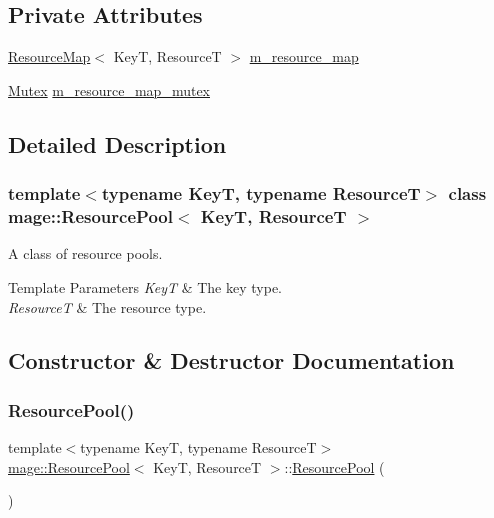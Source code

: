 \subsection*{Private Attributes}
\begin{DoxyCompactItemize}
\item 
\hyperlink{namespacemage_a3aaea9153b9e896914d7a1155d8c7bbe}{Resource\+Map}$<$ KeyT, ResourceT $>$ \hyperlink{classmage_1_1_resource_pool_aecc46ecca2a54ef2816137276b1d73cd}{m\+\_\+resource\+\_\+map}
\item 
\hyperlink{structmage_1_1_mutex}{Mutex} \hyperlink{classmage_1_1_resource_pool_a5857b70ac755db750dcaff5277201f9f}{m\+\_\+resource\+\_\+map\+\_\+mutex}
\end{DoxyCompactItemize}


\subsection{Detailed Description}
\subsubsection*{template$<$typename KeyT, typename ResourceT$>$\newline
class mage\+::\+Resource\+Pool$<$ Key\+T, Resource\+T $>$}

A class of resource pools.


\begin{DoxyTemplParams}{Template Parameters}
{\em KeyT} & The key type. \\
\hline
{\em ResourceT} & The resource type. \\
\hline
\end{DoxyTemplParams}


\subsection{Constructor \& Destructor Documentation}
\hypertarget{classmage_1_1_resource_pool_a94aff142869744ed48fb1b426face48b}{}\label{classmage_1_1_resource_pool_a94aff142869744ed48fb1b426face48b} 
\subsubsection{\texorpdfstring{Resource\+Pool()}{ResourcePool()}\hspace{0.1cm}{\footnotesize\ttfamily [1/3]}}
{\footnotesize\ttfamily template$<$typename KeyT, typename ResourceT$>$ \\
\hyperlink{classmage_1_1_resource_pool}{mage\+::\+Resource\+Pool}$<$ KeyT, ResourceT $>$\+::\hyperlink{classmage_1_1_resource_pool}{Resource\+Pool} (\begin{DoxyParamCaption}{ }\end{DoxyParamCaption})\hspace{0.3cm}{\ttfamily [default]}}

